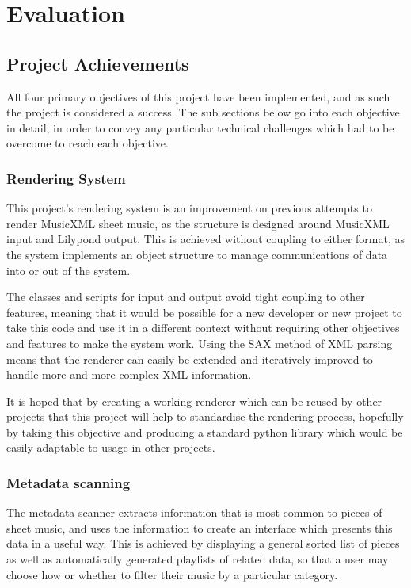 \section{Evaluation}
\subsection{Project Achievements}
All four primary objectives of this project have been implemented, and as such the project is considered a success. The sub sections below go into each objective in detail, in order to convey any particular technical challenges which had to be overcome to reach each objective.
\subsubsection{Rendering System}
This project's rendering system is an improvement on previous attempts to render MusicXML sheet music, as the structure is designed around MusicXML input and Lilypond output. This is achieved without coupling to either format, as the system implements an object structure to manage communications of data into or out of the system.

The classes and scripts for input and output avoid tight coupling to other features, meaning that it would be possible for a new developer or new project to take this code and use it in a different context without requiring other objectives and features to make the system work. Using the SAX method of XML parsing means that the renderer can easily be extended and iteratively improved to handle more and more complex XML information.

It is hoped that by creating a working renderer which can be reused by other projects that this project will help to standardise the rendering process, hopefully by taking this objective and producing a standard python library which would be easily adaptable to usage in other projects.

\subsubsection{Metadata scanning}
The metadata scanner extracts information that is most common to pieces of sheet music, and uses the information to create an interface which presents this data in a useful way. This is achieved by displaying a general sorted list of pieces as well as automatically generated playlists of related data, so that a user may choose how or whether to filter their music by a particular category.


